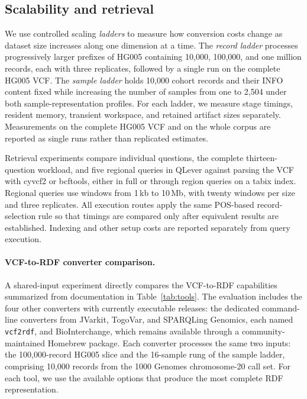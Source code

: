 \documentclass[pdflatex,sn-mathphys-num]{sn-jnl}
\begin{document}
\subsection{Scalability and retrieval}\label{subsec:eval-scalability}
We use controlled scaling \emph{ladders} to measure how conversion costs change as dataset size increases along one dimension at a time.
The \emph{record ladder} processes progressively larger prefixes of HG005 containing 10,000, 100,000, and one million records, each with three replicates, followed by a single run on the complete HG005 VCF.
The \emph{sample ladder} holds 10,000 cohort records and their INFO content fixed while increasing the number of samples from one to 2,504 under both sample-representation profiles.
For each ladder, we measure stage timings, resident memory, transient workspace, and retained artifact sizes separately.
Measurements on the complete HG005 VCF and on the whole corpus are reported as single runs rather than replicated estimates.

Retrieval experiments compare individual questions, the complete thirteen-question workload, and five regional queries in QLever against parsing the VCF with cyvcf2 or bcftools, either in full or through region queries on a tabix index.
Regional queries use windows from 1\,kb to 10\,Mb, with twenty windows per size and three replicates.
All execution routes apply the same POS-based record-selection rule so that timings are compared only after equivalent results are established.
Indexing and other setup costs are reported separately from query execution.

\paragraph{VCF-to-RDF converter comparison.}
A shared-input experiment directly compares the VCF-to-RDF capabilities summarized from documentation in Table~\ref{tab:tools}.
The evaluation includes the four other converters with currently executable releases: the dedicated command-line converters from JVarkit, TogoVar, and SPARQLing Genomics, each named \texttt{vcf2rdf}, and BioInterchange, which remains available through a community-maintained Homebrew package.
Each converter processes the same two inputs: the 100,000-record HG005 slice and the 16-sample rung of the sample ladder, comprising 10,000 records from the 1000 Genomes chromosome-20 call set.
For each tool, we use the available options that produce the most complete RDF representation.
\end{document}
